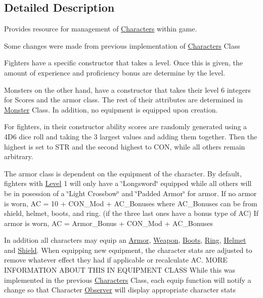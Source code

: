 \subsection{Detailed Description}
Provides resource for management of \hyperlink{class_characters}{Characters} within game. 

Some changes were made from previous implementation of \hyperlink{class_characters}{Characters} Class

Fighters have a specific constructor that takes a level. Once this is given, the amount of experience and proficiency bonus are determine by the level.

Monsters on the other hand, have a constructor that takes their level 6 integers for Scores and the armor class. The rest of their attributes are determined in \hyperlink{class_monster}{Monster} Class. In addition, no equipment is equipped upon creation.

For fighters, in their constructor ability scores are randomly generated using a 4\+D6 dice roll and taking the 3 largest values and adding them together. Then the highest is set to S\+TR and the second highest to C\+ON, while all others remain arbitrary.

The armor class is dependent on the equipment of the character. By default, fighters with \hyperlink{class_level}{Level} 1 will only have a \char`\"{}\+Longsword\char`\"{} equipped while all others will be in posession of a \char`\"{}\+Light Crossbow\char`\"{} and \char`\"{}\+Padded Armor\char`\"{} for armor. If no armor is worn, AC = 10 + C\+O\+N\+\_\+\+Mod + A\+C\+\_\+\+Bonuses where A\+C\+\_\+\+Bonuses can be from shield, helmet, boots, and ring. (if the three last ones have a bonus type of AC) If armor is worn, AC = Armor\+\_\+\+Bonus + C\+O\+N\+\_\+\+Mod + A\+C\+\_\+\+Bonuses

In addition all characters may equip an \hyperlink{class_armor}{Armor}, \hyperlink{class_weapon}{Weapon}, \hyperlink{class_boots}{Boots}, \hyperlink{class_ring}{Ring}, \hyperlink{class_helmet}{Helmet} and \hyperlink{class_shield}{Shield}. When equipping new equipment, the character stats are adjusted to remove whatever effect they had if applicable or recalculate AC. M\+O\+RE I\+N\+F\+O\+R\+M\+A\+T\+I\+ON A\+B\+O\+UT T\+H\+IS IN E\+Q\+U\+I\+P\+M\+E\+NT C\+L\+A\+SS While this was implemented in the previous \hyperlink{class_characters}{Characters} Class, each equip function will notify a change so that Character \hyperlink{class_observer}{Observer} will display appropriate character stats

